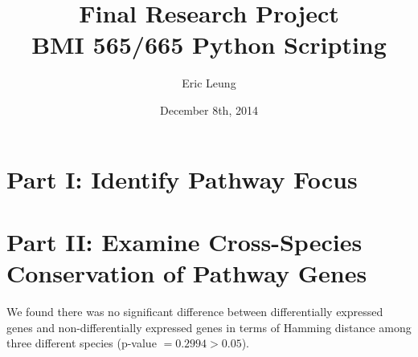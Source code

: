 \documentclass[12pt, a4paper]{report}
\author{Eric Leung}
\title{Final Research Project \\
	BMI 565/665 Python Scripting}
\date{December 8th, 2014}
\begin{document}
\maketitle

\section*{Part I: Identify Pathway Focus}

\section*{Part II: Examine Cross-Species Conservation of Pathway Genes}

We found there was no significant difference between differentially expressed genes and non-differentially expressed genes in terms of Hamming distance among three different species (p-value $= 0.2994 > 0.05$).
\end{document}
